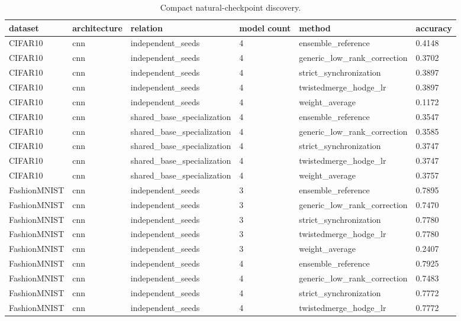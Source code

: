 \begin{table}[t]
\centering
\caption{Compact natural-checkpoint discovery.}
\begin{tabular}{llllll}
\toprule
dataset & architecture & relation & model count & method & accuracy \\
\midrule
CIFAR10 & cnn & independent\_seeds & 4 & ensemble\_reference & 0.4148 \\
CIFAR10 & cnn & independent\_seeds & 4 & generic\_low\_rank\_correction & 0.3702 \\
CIFAR10 & cnn & independent\_seeds & 4 & strict\_synchronization & 0.3897 \\
CIFAR10 & cnn & independent\_seeds & 4 & twistedmerge\_hodge\_lr & 0.3897 \\
CIFAR10 & cnn & independent\_seeds & 4 & weight\_average & 0.1172 \\
CIFAR10 & cnn & shared\_base\_specialization & 4 & ensemble\_reference & 0.3547 \\
CIFAR10 & cnn & shared\_base\_specialization & 4 & generic\_low\_rank\_correction & 0.3585 \\
CIFAR10 & cnn & shared\_base\_specialization & 4 & strict\_synchronization & 0.3747 \\
CIFAR10 & cnn & shared\_base\_specialization & 4 & twistedmerge\_hodge\_lr & 0.3747 \\
CIFAR10 & cnn & shared\_base\_specialization & 4 & weight\_average & 0.3757 \\
FashionMNIST & cnn & independent\_seeds & 3 & ensemble\_reference & 0.7895 \\
FashionMNIST & cnn & independent\_seeds & 3 & generic\_low\_rank\_correction & 0.7470 \\
FashionMNIST & cnn & independent\_seeds & 3 & strict\_synchronization & 0.7780 \\
FashionMNIST & cnn & independent\_seeds & 3 & twistedmerge\_hodge\_lr & 0.7780 \\
FashionMNIST & cnn & independent\_seeds & 3 & weight\_average & 0.2407 \\
FashionMNIST & cnn & independent\_seeds & 4 & ensemble\_reference & 0.7925 \\
FashionMNIST & cnn & independent\_seeds & 4 & generic\_low\_rank\_correction & 0.7483 \\
FashionMNIST & cnn & independent\_seeds & 4 & strict\_synchronization & 0.7772 \\
FashionMNIST & cnn & independent\_seeds & 4 & twistedmerge\_hodge\_lr & 0.7772 \\

\end{tabular}
\end{table}
